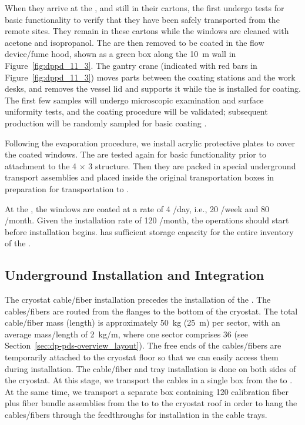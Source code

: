 When they arrive at the , and still in their cartons, the  first undergo tests for basic functionality to verify that they have been safely transported from the remote sites. They remain in these cartons while the windows are cleaned with acetone and isopropanol. The  are then removed to be coated in the flow device/fume hood, shown as a green box along the \SI{10}{\m} wall in Figure~\ref{fig:dppd_11_3}.  The gantry crane (indicated with red bars in Figure~\ref{fig:dppd_11_3}) moves parts between the coating stations and the work desks, %
and removes the vessel lid and supports it while the  is installed for coating.
The first few
samples will undergo microscopic examination and surface uniformity tests, and the
coating procedure will be validated; subsequent production  will be randomly
sampled for basic coating .

Following the evaporation procedure, we install acrylic protective plates to cover the coated  windows.
The  are tested again for basic functionality prior to attachment %
to the \num{4} $\times$ \num{3} structure. Then they are packed in special underground transport
assemblies and placed inside the original transportation boxes in preparation for transportation to .

At the , the  windows are coated at a rate of \num{4} /day, i.e., \num{20} /week and \num{80} /month. Given the installation rate of \num{120} /month, the  operations should start before installation begins.  has sufficient storage capacity for the entire  inventory of the . 

\subsection{Underground Installation and Integration}
\label{subsec:dp-pds-undergroundinstallation}

The cryostat cable/fiber installation precedes the installation of the . The cables/fibers are routed from the flanges to the bottom of the cryostat. The total cable/fiber mass (length) is approximately \SI{50}{\kg} (\SI{25}{\m}) per sector, with an average mass/length of \SI{2}{\kg/\m}, where one sector comprises \num{36}  (see Section~\ref{sec:dp-pds-overview_layout}). The free ends of the cables/fibers are temporarily attached to the cryostat floor so that we can easily access them during installation. The cable/fiber and tray installation is done on both sides of the cryostat. At this stage, we transport the  cables %
in a single box from the  to . At the same time, we transport a separate box containing \num{120} calibration fiber plus fiber bundle assemblies %
 from the  to %
 to the cryostat roof in order to hang the cables/fibers %
 through the feedthroughs for installation in the cable trays.  


